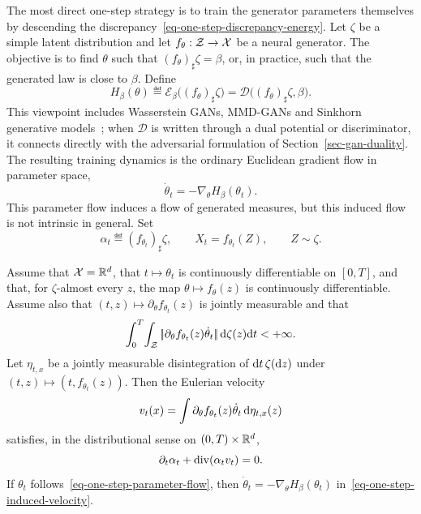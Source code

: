 The most direct one-step strategy is to train the generator parameters themselves by descending the discrepancy~\eqref{eq-one-step-discrepancy-energy}. Let $\zeta$ be a simple latent distribution and let $f_\theta:\mathcal{Z}\to\mathcal{X}$ be a neural generator. The objective is to find $\theta$ such that $(f_\theta)_\sharp\zeta=\beta$, or, in practice, such that the generated law is close to $\beta$. Define
\begin{equation}\label{eq-one-step-parameter-discrepancy}
	H_\beta(\theta)
	\eqdef
	\mathcal E_\beta\big((f_\theta)_\sharp\zeta\big)
	=
	\mathcal D\big((f_\theta)_\sharp\zeta,\beta\big).
\end{equation}
This viewpoint includes Wasserstein GANs, MMD-GANs and Sinkhorn generative models~\cite{WassersteinGAN,MMD-GAN,2017-Genevay-AutoDiff}; when $\mathcal D$ is written through a dual potential or discriminator, it connects directly with the adversarial formulation of Section~\ref{sec-gan-duality}. The resulting training dynamics is the ordinary Euclidean gradient flow in parameter space,
\begin{equation}\label{eq-one-step-parameter-flow}
	\dot\theta_t=-\nabla_\theta H_\beta(\theta_t).
\end{equation}
This parameter flow induces a flow of generated measures, but this induced flow is not intrinsic in general. Set
\[
	\alpha_t\eqdef(f_{\theta_t})_\sharp\zeta,
	\qquad
	X_t=f_{\theta_t}(Z),
	\qquad
	Z\sim\zeta.
\]
\begin{prop}\label{prop-parameter-path-continuity}
	Assume that $\mathcal{X}=\mathbb{R}^d$, that $t\mapsto\theta_t$ is continuously differentiable on $[0,T]$, and that, for $\zeta$-almost every $z$, the map $\theta\mapsto f_\theta(z)$ is continuously differentiable. Assume also that $(t,z)\mapsto\partial_\theta f_{\theta_t}(z)$ is jointly measurable and that
	\[
		\int_0^T\!\int_{\mathcal{Z}}
		|\!| \partial_\theta f_{\theta_t}(z)\dot\theta_t |\!|
		\,\mathrm{d}\zeta(z)\mathrm{d} t<+\infty.
	\]
	Let $\eta_{t,x}$ be a jointly measurable disintegration of $\mathrm{d} t\,\zeta(\mathrm{d} z)$ under $(t,z)\mapsto(t,f_{\theta_t}(z))$. Then the Eulerian velocity
	\begin{equation}\label{eq-one-step-induced-velocity}
		v_t(x)=\int \partial_\theta f_{\theta_t}(z)\dot\theta_t\,\mathrm{d}\eta_{t,x}(z)
	\end{equation}
		satisfies, in the distributional sense on $(0,T)\times\mathbb{R}^d$,
	\begin{equation}\label{eq-one-step-induced-continuity}
		\partial_t\alpha_t+\operatorname{div}(\alpha_t v_t)=0.
	\end{equation}
	If $\theta_t$ follows~\eqref{eq-one-step-parameter-flow}, then $\dot\theta_t=-\nabla_\theta H_\beta(\theta_t)$ in~\eqref{eq-one-step-induced-velocity}.
\end{prop}


